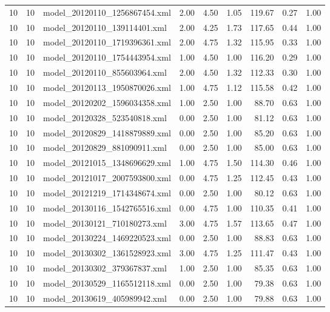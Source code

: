\begin{table}[ht]
\begin{tabular}{rrlrrrrrr}
   10 &  10 & model\_20120110\_1256867454.xml & 2.00 & 4.50 & 1.05 & 119.67 & 0.27 & 1.00 \\ 
   10 &  10 & model\_20120110\_139114401.xml & 2.00 & 4.25 & 1.73 & 117.65 & 0.44 & 1.00 \\ 
   10 &  10 & model\_20120110\_1719396361.xml & 2.00 & 4.75 & 1.32 & 115.95 & 0.33 & 1.00 \\ 
   10 &  10 & model\_20120110\_1754443954.xml & 1.00 & 4.50 & 1.00 & 116.20 & 0.29 & 1.00 \\ 
   10 &  10 & model\_20120110\_855603964.xml & 2.00 & 4.50 & 1.32 & 112.33 & 0.30 & 1.00 \\ 
   10 &  10 & model\_20120113\_1950870026.xml & 1.00 & 4.75 & 1.12 & 115.58 & 0.42 & 1.00 \\ 
   10 &  10 & model\_20120202\_1596034358.xml & 1.00 & 2.50 & 1.00 & 88.70 & 0.63 & 1.00 \\ 
   10 &  10 & model\_20120328\_523540818.xml & 0.00 & 2.50 & 1.00 & 81.12 & 0.63 & 1.00 \\ 
   10 &  10 & model\_20120829\_1418879889.xml & 0.00 & 2.50 & 1.00 & 85.20 & 0.63 & 1.00 \\ 
   10 &  10 & model\_20120829\_881090911.xml & 0.00 & 2.50 & 1.00 & 85.00 & 0.63 & 1.00 \\ 
   10 &  10 & model\_20121015\_1348696629.xml & 1.00 & 4.75 & 1.50 & 114.30 & 0.46 & 1.00 \\ 
   10 &  10 & model\_20121017\_2007593800.xml & 0.00 & 4.75 & 1.25 & 112.45 & 0.43 & 1.00 \\ 
   10 &  10 & model\_20121219\_1714348674.xml & 0.00 & 2.50 & 1.00 & 80.12 & 0.63 & 1.00 \\ 
   10 &  10 & model\_20130116\_1542765516.xml & 0.00 & 4.75 & 1.00 & 110.35 & 0.41 & 1.00 \\ 
   10 &  10 & model\_20130121\_710180273.xml & 3.00 & 4.75 & 1.57 & 113.65 & 0.47 & 1.00 \\ 
   10 &  10 & model\_20130224\_1469220523.xml & 0.00 & 2.50 & 1.00 & 88.83 & 0.63 & 1.00 \\ 
   10 &  10 & model\_20130302\_1361528923.xml & 3.00 & 4.75 & 1.25 & 111.47 & 0.43 & 1.00 \\ 
   10 &  10 & model\_20130302\_379367837.xml & 1.00 & 2.50 & 1.00 & 85.35 & 0.63 & 1.00 \\ 
   10 &  10 & model\_20130529\_1165512118.xml & 0.00 & 2.50 & 1.00 & 79.38 & 0.63 & 1.00 \\ 
   10 &  10 & model\_20130619\_405989942.xml & 0.00 & 2.50 & 1.00 & 79.88 & 0.63 & 1.00 \\ 

\end{tabular}
\end{table}
